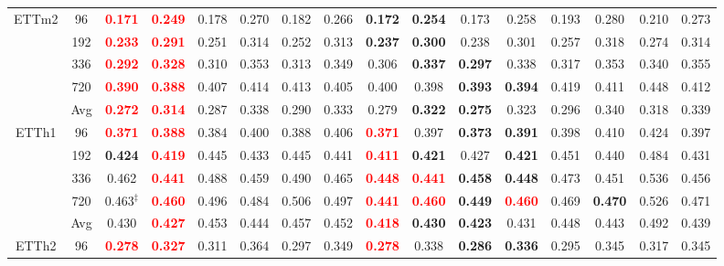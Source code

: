 \documentclass[a4paper,fleqn]{cas-sc}
\begin{document}
\begin{table}[t]
{\begin{tabular}{c|c|cc|cc|cc|cc|cc|cc|cc}
\midrule
\multirow{5}{*}{ETTm2}
& 96 & \textbf{\textcolor{red}{0.171}} & \textbf{\textcolor{red}{0.249}} & 0.178 & 0.270 & 0.182 & 0.266 & \textbf{0.172} & \textbf{0.254} & 0.173 & 0.258 & 0.193 & 0.280 & 0.210 & 0.273 \\
& 192 & \textbf{\textcolor{red}{0.233}} & \textbf{\textcolor{red}{0.291}} & 0.251 & 0.314 & 0.252 & 0.313 & \textbf{0.237} & \textbf{0.300} & 0.238 & 0.301 & 0.257 & 0.318 & 0.274 & 0.314 \\
& 336 & \textbf{\textcolor{red}{0.292}} & \textbf{\textcolor{red}{0.328}} & 0.310 & 0.353 & 0.313 & 0.349 & 0.306 & \textbf{0.337} & \textbf{0.297} & 0.338 & 0.317 & 0.353 & 0.340 & 0.355 \\
& 720 & \textbf{\textcolor{red}{0.390}} & \textbf{\textcolor{red}{0.388}} & 0.407 & 0.414 & 0.413 & 0.405 & 0.400 & 0.398 & \textbf{0.393} & \textbf{0.394} & 0.419 & 0.411 & 0.448 & 0.412 \\
& Avg & \textbf{\textcolor{red}{0.272}} & \textbf{\textcolor{red}{0.314}} & 0.287 & 0.338 & 0.290 & 0.333 & 0.279 & \textbf{0.322} & \textbf{0.275} & 0.323 & 0.296 & 0.340 & 0.318 & 0.339 \\
\midrule
\multirow{5}{*}{ETTh1}
& 96 & \textbf{\textcolor{red}{0.371}} & \textbf{\textcolor{red}{0.388}} & 0.384 & 0.400 & 0.388 & 0.406 & \textbf{\textcolor{red}{0.371}} & 0.397 & \textbf{0.373} & \textbf{0.391} & 0.398 & 0.410 & 0.424 & 0.397 \\
& 192 & \textbf{0.424} & \textbf{\textcolor{red}{0.419}} & 0.445 & 0.433 & 0.445 & 0.441 & \textbf{\textcolor{red}{0.411}} & \textbf{0.421} & 0.427 & \textbf{0.421} & 0.451 & 0.440 & 0.484 & 0.431 \\
& 336 & 0.462 & \textbf{\textcolor{red}{0.441}} & 0.488 & 0.459 & 0.490 & 0.465 & \textbf{\textcolor{red}{0.448}} & \textbf{\textcolor{red}{0.441}} & \textbf{0.458} & \textbf{0.448} & 0.473 & 0.451 & 0.536 & 0.456 \\
& 720 & 0.463$^\ddagger$ & \textbf{\textcolor{red}{0.460}} & 0.496 & 0.484 & 0.506 & 0.497 & \textbf{\textcolor{red}{0.441}} & \textbf{\textcolor{red}{0.460}} & \textbf{0.449} & \textbf{\textcolor{red}{0.460}} & 0.469 & \textbf{0.470} & 0.526 & 0.471 \\
& Avg & 0.430 & \textbf{\textcolor{red}{0.427}} & 0.453 & 0.444 & 0.457 & 0.452 & \textbf{\textcolor{red}{0.418}} & \textbf{0.430} & \textbf{0.423} & 0.431 & 0.448 & 0.443 & 0.492 & 0.439 \\
\midrule
\multirow{5}{*}{ETTh2}
& 96 & \textbf{\textcolor{red}{0.278}} & \textbf{\textcolor{red}{0.327}} & 0.311 & 0.364 & 0.297 & 0.349 & \textbf{\textcolor{red}{0.278}} & 0.338 & \textbf{0.286} & \textbf{0.336} & 0.295 & 0.345 & 0.317 & 0.345 \\

\end{tabular}}
\end{table}
\end{document}
